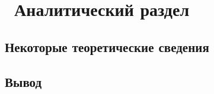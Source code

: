 
\chapter{ Аналитический раздел}
\label{cha:analysis}

\section{Некоторые теоретические сведения}

\section{Вывод}




